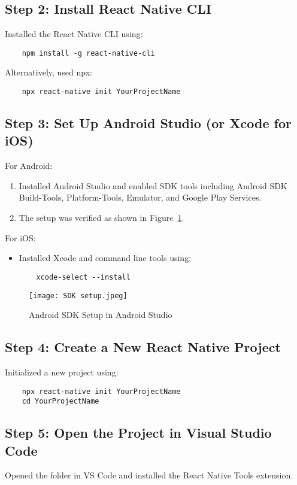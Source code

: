 \documentclass{article}
\begin{document}
\subsection{Step 2: Install React Native CLI}
Installed the React Native CLI using:
\begin{verbatim}
    npm install -g react-native-cli
\end{verbatim}
Alternatively, used npx:
\begin{verbatim}
    npx react-native init YourProjectName
\end{verbatim}

\subsection{Step 3: Set Up Android Studio (or Xcode for iOS)}
For Android:
\begin{enumerate}
    \item Installed Android Studio and enabled SDK tools including Android SDK Build-Tools, Platform-Tools, Emulator, and Google Play Services.
    \item The setup was verified as shown in Figure~\ref{fig:sdk_setup}.
\end{enumerate}
For iOS:
\begin{itemize}
    \item Installed Xcode and command line tools using:
    \begin{verbatim}
    xcode-select --install
    \end{verbatim}
\end{itemize}

\begin{figure}[H]
    \centering
    \texttt{[image: SDK setup.jpeg]}
    \caption{Android SDK Setup in Android Studio}
    \label{fig:sdk_setup}
\end{figure}

\subsection{Step 4: Create a New React Native Project}
Initialized a new project using:
\begin{verbatim}
    npx react-native init YourProjectName
    cd YourProjectName
\end{verbatim}

\subsection{Step 5: Open the Project in Visual Studio Code}
Opened the folder in VS Code and installed the React Native Tools extension.
\end{document}
